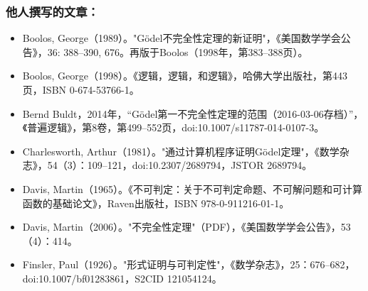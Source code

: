 \subsubsection{他人撰写的文章：}
\begin{itemize}
\item Boolos, George（1989）。"Gödel不完全性定理的新证明"，《美国数学学会公告》，36: 388–390, 676。再版于Boolos（1998年，第383–388页）。
\item Boolos, George（1998）。《逻辑，逻辑，和逻辑》，哈佛大学出版社，第443页，ISBN 0-674-53766-1。
\item Bernd Buldt，2014年，“Gödel第一不完全性定理的范围（2016-03-06存档）”，《普遍逻辑》，第8卷，第499–552页，doi:10.1007/s11787-014-0107-3。
\item Charlesworth, Arthur（1981）。"通过计算机程序证明Gödel定理"，《数学杂志》，54（3）：109–121，doi:10.2307/2689794，JSTOR 2689794。
\item Davis, Martin（1965）。《不可判定：关于不可判定命题、不可解问题和可计算函数的基础论文》，Raven出版社，ISBN 978-0-911216-01-1。
\item Davis, Martin（2006）。"不完全性定理"（PDF），《美国数学学会公告》，53（4）：414。
\item Finsler, Paul（1926）。"形式证明与可判定性"，《数学杂志》，25：676–682，doi:10.1007/bf01283861，S2CID 121054124。

\end{itemize}